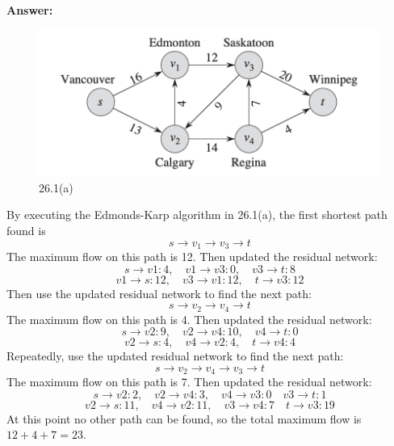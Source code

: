 \documentclass[12pt]{article}
\begin{document}
\textbf{Answer: }
\begin{figure}[h]
    \centering
    \includegraphics[width=0.5\linewidth]{截屏2024-11-18 下午8.43.56.png}
    \caption{26.1(a)}
    \label{fig:26.1(a)}
\end{figure}
By executing the Edmonds-Karp algorithm in 26.1(a), the first shortest path found is 
\[s \rightarrow v_1 \rightarrow v_3 \rightarrow t\]
The maximum flow on this path is 12.
Then updated the residual network:
\[s \rightarrow v1: 4, \quad v1 \rightarrow v3: 0, \quad v3 \rightarrow t: 8\]
\[v1 \rightarrow s: 12, \quad v3 \rightarrow v1: 12, \quad t \rightarrow v3: 12\]
Then use the updated residual network to find the next path:
\[s  \rightarrow v_2 \rightarrow v_4 \rightarrow t\]
The maximum flow on this path is 4.
Then updated the residual network:
\[s \rightarrow v2: 9, \quad v2 \rightarrow v4: 10, \quad v4 \rightarrow t: 0 \]
\[v2 \rightarrow s: 4, \quad v4 \rightarrow v2: 4, \quad t \rightarrow v4: 4 \]
Repeatedly, use the updated residual network to find the next path:
\[s \rightarrow v_2 \rightarrow v_4  \rightarrow v_3 \rightarrow t\]
The maximum flow on this path is 7.
Then updated the residual network:
\[s \rightarrow v2: 2, \quad v2 \rightarrow v4: 3, \quad v4 \rightarrow v3: 0 \quad v3 \rightarrow t: 1\]
\[v2 \rightarrow s: 11, \quad v4 \rightarrow v2: 11, \quad v3 \rightarrow v4: 7 \quad t \rightarrow v3: 19\]
At this point no other path can be found, so the total maximum flow is \(12+4+7=23\).
\end{document}
